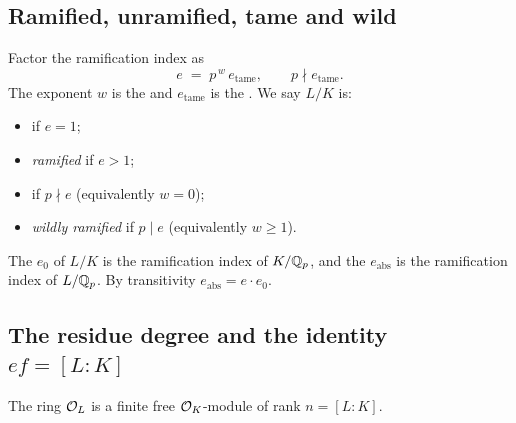 \subsection{Ramified, unramified, tame and wild}
\label{subsec:tame-wild}

\begin{definition}
\label{def:tame-wild}
\notready
Factor the ramification index as
\[
  e \;=\; p^{\,w}\,e_{\mathrm{tame}}, \qquad p\nmid e_{\mathrm{tame}} .
\]
The exponent $w$ is the
 and
$e_{\mathrm{tame}}$ is the
. We say $L/K$ is:
\begin{itemize}
  \item {} if $e=1$;
  \item \emph{ramified} if $e>1$;
  \item {} if $p\nmid e$
        (equivalently $w=0$);
  \item \emph{wildly ramified} if $p\mid e$ (equivalently $w\ge 1$).
\end{itemize}
\end{definition}

\begin{definition}
\label{def:base-absolute}
\notready
The  $e_0$ of $L/K$
is the ramification index of $K/\mathbb{Q}_p$, and the
$e_{\mathrm{abs}}$ is the ramification index of $L/\mathbb{Q}_p$. By transitivity
$e_{\mathrm{abs}}=e\cdot e_0$.
\end{definition}

\subsection{The residue degree and the identity \texorpdfstring{$ef=[L:K]$}{ef=[L:K]}}
\label{subsec:ef}

\begin{lemma}
\label{lem:OL-free}
\leanok
\notready
The ring $\mathcal{O}_L$ is a finite free $\mathcal{O}_K$-module of rank $n=[L:K]$.
\end{lemma}

